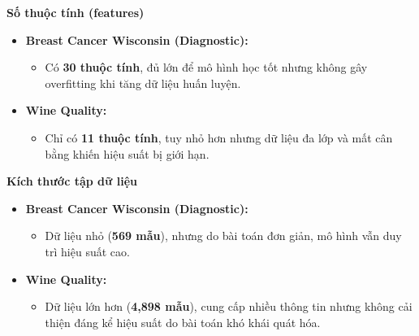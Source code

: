 \textbf{Số thuộc tính (features)}
\begin{itemize}
	\item \textbf{Breast Cancer Wisconsin (Diagnostic):}
	\begin{itemize}
		\item Có \textbf{30 thuộc tính}, đủ lớn để mô hình học tốt nhưng không gây overfitting khi tăng dữ liệu huấn luyện.
	\end{itemize}
	\item \textbf{Wine Quality:}
	\begin{itemize}
		\item Chỉ có \textbf{11 thuộc tính}, tuy nhỏ hơn nhưng dữ liệu đa lớp và mất cân bằng khiến hiệu suất bị giới hạn.
	\end{itemize}
\end{itemize}

\textbf{Kích thước tập dữ liệu}
\begin{itemize}
	\item \textbf{Breast Cancer Wisconsin (Diagnostic):}
	\begin{itemize}
		\item Dữ liệu nhỏ (\textbf{569 mẫu}), nhưng do bài toán đơn giản, mô hình vẫn duy trì hiệu suất cao.
	\end{itemize}
	\item \textbf{Wine Quality:}
	\begin{itemize}
		\item Dữ liệu lớn hơn (\textbf{4,898 mẫu}), cung cấp nhiều thông tin nhưng không cải thiện đáng kể hiệu suất do bài toán khó khái quát hóa.
	\end{itemize}
\end{itemize}